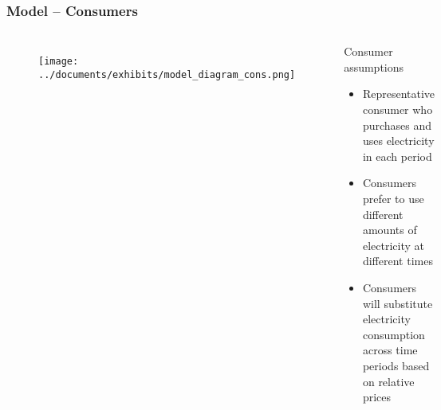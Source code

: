 \documentclass[aspectratio=169]{beamer}
\begin{document}
\begin{frame}
\frametitle{Model -- Consumers}



\begin{columns}[T]%
	
	\begin{figure}
		\texttt{[image: ../documents/exhibits/model\_diagram\_cons.png]} 
	\end{figure}
	
		\begin{block}{Consumer assumptions}
			\begin{itemize}
				\setlength\itemsep{0.25em}
				\item Representative consumer who purchases and uses electricity in each period
				\item Consumers prefer to use different amounts of electricity at different times
				\item Consumers will substitute electricity consumption across time periods based on relative prices%
			\end{itemize}
		\end{block}
	
\end{columns}


\end{frame}
\end{document}
